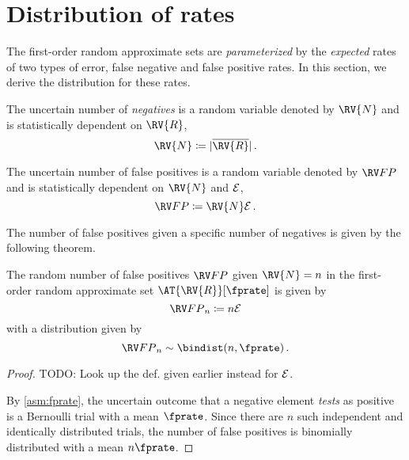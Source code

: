 \documentclass[ ../main.tex]{subfiles}
\begin{document}
\section{Distribution of rates}
\label{sec:characteristics}
The first-order random approximate sets are \emph{parameterized} by the \emph{expected} rates of two types of error, false negative and false positive rates.
In this section, we derive the distribution for these rates.

\begin{definition}
The uncertain number of \emph{negatives} is a random variable denoted by $\RV{N}$ and is statistically dependent on $\RV{R}$,
\begin{equation}
\RV{N} \coloneqq \Card{\SetComplement[\RV{R}]}\,.
\end{equation}
\end{definition}

\begin{definition}
The uncertain number of false positives is a random variable denoted by $\FP$ and is statistically dependent on $\RV{N}$ and $\mathcal{E}$,
\begin{equation}
	\FP \coloneqq \RV{N} \FPR\,.
\end{equation}
\end{definition}

The number of false positives given a specific number of negatives is given by the following theorem.
\begin{theorem}
\label{thm:fpbinom}
The random number of false positives $\FP$ given $\RV{N} = n$ in the first-order random approximate set $\AT{\RV{R}}[\fprate]$ is given by
\begin{equation}
	\FP_n \coloneqq n \FPR
\end{equation}
with a distribution given by
\begin{equation}
    \FP_n \sim \bindist(n, \fprate)\,.
\end{equation}
\end{theorem}
\begin{proof}
TODO: Look up the def. given earlier instead for $\mathcal{E}$.

By \cref{asm:fprate}, the uncertain outcome that a negative element \emph{tests} as positive is a Bernoulli trial with a mean $\fprate$.
Since there are $n$ such independent and identically distributed trials, the number of false positives is binomially distributed with a mean $n \fprate$.
\end{proof}
\end{document}
